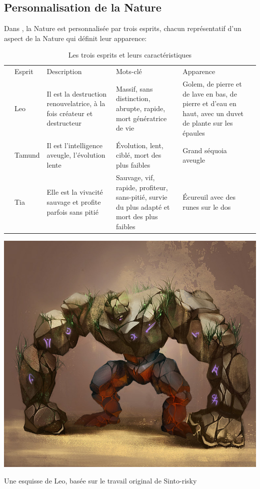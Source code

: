 \subsection{Personnalisation de la Nature}
\label{sec:personnalisationNature}
Dans \nomJeu, la Nature est personnalisée par trois esprits, chacun représentatif d'un aspect de la Nature qui définit leur apparence:

\begin{table}[ht!]
	\newlength{\tableLength}
	\setlength{\tableLength}{\textwidth+2.3cm}
	
	\hspace{-2.3cm}
	\begin{tabu} to 
		\rowfont{\bfseries\sffamily\leavevmode\color{white}}
		& Esprit & Description & Mots-clé & Apparence & \\
		& Leo & Il est la destruction renouvelatrice, à la fois créateur et destructeur & Massif, sans distinction, abrupte, rapide, mort génératrice de vie & Golem, de pierre et de lave en bas, de pierre et d'eau en haut, avec un duvet de plante sur les épaules & \\
		& Tamund & Il est l'intelligence aveugle, l'évolution lente & Évolution, lent, ciblé, mort des plus faibles & Grand séquoia aveugle & \\
		& Tia & Elle est la vivacité sauvage et profite parfois sans pitié & Sauvage, vif, rapide, profiteur, sans-pitié, survie du plus adapté et mort des plus faibles & Écureuil avec des runes sur le dos & \\
	\end{tabu}
	
	\caption{Les trois esprits et leurs caractéristiques}
\end{table}

\begin{figureWithNotes}[ht!]
	\center
	\includegraphics[width=\textwidth]{images/Monde/Leo/Leo.png}
	\caption{Une esquisse de Leo, basée sur le travail original de Sinto-risky {\cite{StoneGolem_Sinto-risky}}}
\end{figureWithNotes}
